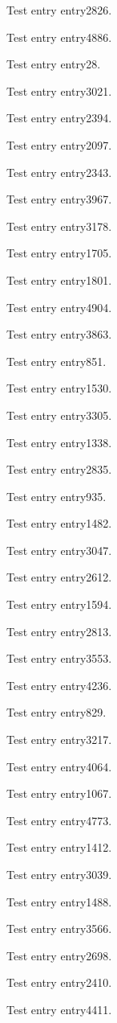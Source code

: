 Test entry \gls{entry2826}.

Test entry \gls{entry4886}.

Test entry \gls{entry28}.

Test entry \gls{entry3021}.

Test entry \gls{entry2394}.

Test entry \gls{entry2097}.

Test entry \gls{entry2343}.

Test entry \gls{entry3967}.

Test entry \gls{entry3178}.

Test entry \gls{entry1705}.

Test entry \gls{entry1801}.

Test entry \gls{entry4904}.

Test entry \gls{entry3863}.

Test entry \gls{entry851}.

Test entry \gls{entry1530}.

Test entry \gls{entry3305}.

Test entry \gls{entry1338}.

Test entry \gls{entry2835}.

Test entry \gls{entry935}.

Test entry \gls{entry1482}.

Test entry \gls{entry3047}.

Test entry \gls{entry2612}.

Test entry \gls{entry1594}.

Test entry \gls{entry2813}.

Test entry \gls{entry3553}.

Test entry \gls{entry4236}.

Test entry \gls{entry829}.

Test entry \gls{entry3217}.

Test entry \gls{entry4064}.

Test entry \gls{entry1067}.

Test entry \gls{entry4773}.

Test entry \gls{entry1412}.

Test entry \gls{entry3039}.

Test entry \gls{entry1488}.

Test entry \gls{entry3566}.

Test entry \gls{entry2698}.

Test entry \gls{entry2410}.

Test entry \gls{entry4411}.

